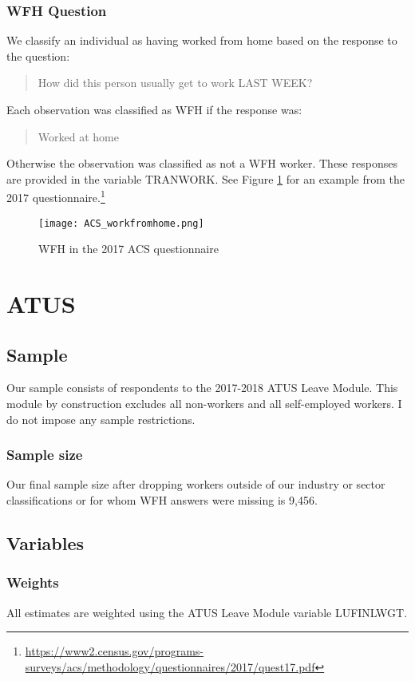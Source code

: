 \documentclass{article}
\begin{document}
\subsubsection{WFH Question}
We classify an individual as having worked from home based on the response to the question:
\begin{quote}
How did this person usually get to work LAST WEEK?
\end{quote}
Each observation was classified as WFH if the response was:
\begin{quote}
Worked at home
\end{quote}
Otherwise the observation was classified as not a WFH worker.
These responses are provided in the variable TRANWORK.
See Figure \ref{ACS-WFH} for an example from the 2017 questionnaire.\footnote{\url{https://www2.census.gov/programs-surveys/acs/methodology/questionnaires/2017/quest17.pdf}}

\begin{figure}
\centering
\label{ACS-WFH}
\texttt{[image: ACS\_workfromhome.png]}
\caption{WFH in the 2017 ACS questionnaire}
\end{figure}

\section{ATUS}

\subsection{Sample}
Our sample consists of respondents to the 2017-2018 ATUS Leave Module. This module by construction excludes all non-workers and all self-employed workers. I do not impose any sample restrictions.

\subsubsection{Sample size}
Our final sample size after dropping workers outside of our industry or sector classifications or for whom WFH answers were missing is 9,456.

\subsection{Variables}

\subsubsection{Weights}
All estimates are weighted using the ATUS Leave Module variable LUFINLWGT.
\end{document}
